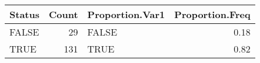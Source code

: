 
\begin{tabular}{lrlr}
\toprule
Status & Count & Proportion.Var1 & Proportion.Freq\\
\midrule
FALSE & 29 & FALSE & 0.18\\
TRUE & 131 & TRUE & 0.82\\
\bottomrule
\end{tabular}